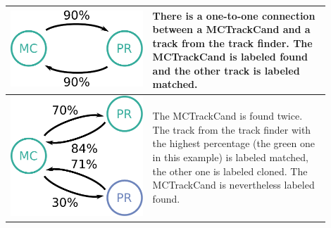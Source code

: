 \begin{table}
  \centering
  \begin{tabular}{m{0.4\linewidth}m{0.5\linewidth}} \toprule
    \centering \includegraphics[width=0.8\linewidth]{figures/theory/fom_found.pdf} & There is a one-to-one connection between a MCTrackCand and a track from the track finder. The MCTrackCand is labeled found and the other track is labeled matched. \\ \midrule
    \centering \includegraphics[width=0.8\linewidth]{figures/theory/fom_clone.pdf} & The MCTrackCand is found twice. The track from the track finder with the highest percentage (the green one in this example) is labeled matched, the other one is labeled cloned. The MCTrackCand is nevertheless labeled found. \\  \midrule

\end{tabular}
\end{table}
